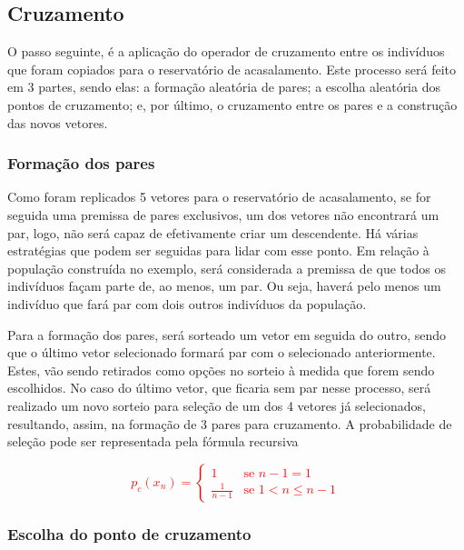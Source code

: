 \subsection{Cruzamento}

O passo seguinte, é a aplicação do operador de cruzamento entre os indivíduos que foram copiados para o reservatório de acasalamento. Este processo será feito em 3 partes, sendo elas: a formação aleatória de pares; a escolha aleatória dos pontos de cruzamento; e, por último, o cruzamento entre os pares e a construção das novos vetores.

\subsubsection{Formação dos pares}

Como foram replicados 5 vetores para o reservatório de acasalamento, se for seguida uma premissa de pares exclusivos, um dos vetores não encontrará um par, logo, não será capaz de efetivamente criar um descendente. Há várias estratégias que podem ser seguidas para lidar com esse ponto. Em relação à população construída no exemplo, será considerada a premissa de que todos os indivíduos façam parte de, ao menos, um par. Ou seja, haverá pelo menos um indivíduo que fará par com dois outros indivíduos da população. 

Para a formação dos pares, será sorteado um vetor em seguida do outro, sendo que o último vetor selecionado formará par com o selecionado anteriormente. Estes, vão sendo retirados como opções no sorteio à medida que forem sendo escolhidos. No caso do último vetor, que ficaria sem par nesse processo, será realizado um novo sorteio para seleção de um dos 4 vetores já selecionados, resultando, assim, na formação de 3 pares para cruzamento. A probabilidade de seleção pode ser representada pela fórmula recursiva

\textcolor{red}{
	\begin{equation}
		p_{c}(x_{n}) = {
			\begin{cases}
				1 &\text{se $n-1 = 1$} \\
				\frac{1}{n-1} & \text{se $1 < n \leq n-1$}
			\end{cases}
		}
	\end{equation}
}

\subsubsection{Escolha do ponto de cruzamento}

